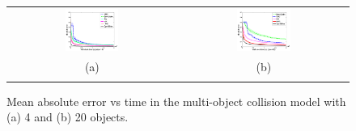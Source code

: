 \documentclass[letterpaper]{article}
\newcommand{\nnn}{0.33}
\newcommand{\nnh}{0.23}
\begin{document}
\begin{figure}[t!]
\vspace{-0mm}
\begin{center}
\begin{tabular}{cc}
   \hspace{-5mm} \includegraphics[width=\nnn\textwidth, height=\nnh\textwidth]{../plotsx/collisionx/err-vs-time__param5-shaded.pdf} 
& \hspace{-3mm} \includegraphics[width=\nnn\textwidth, height=\nnh\textwidth]{../plotsx/collisionx/err-vs-time__param15-shaded.pdf} 
\vspace{-1.5mm}
\\
\hspace{-5mm} \footnotesize(a) 
& \hspace{-4mm} \footnotesize(b) 
\\
\multicolumn{2}{c}{}
\end{tabular}
\end{center}
\vspace{-6mm}
\caption{\footnotesize 
Mean absolute error vs time in the multi-object collision model with (a) 4 and (b) 20 objects.}
\label{fig:multi-object.mom}
\vspace{-2mm}
\end{figure}
\end{document}
